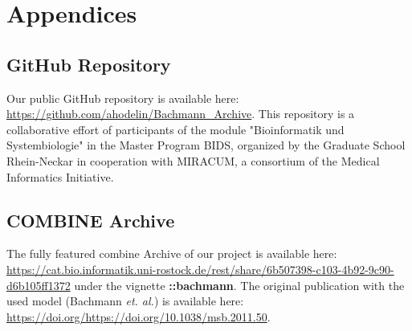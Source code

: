 \section*{Appendices}

\subsection*{GitHub Repository}

Our public GitHub repository is available here: \url{https://github.com/ahodelin/Bachmann_Archive}.
This repository is a collaborative effort of participants of the module "Bioinformatik und Systembiologie" in the Master Program BIDS, organized by the Graduate School Rhein-Neckar in cooperation with MIRACUM, a consortium of the Medical Informatics Initiative.

\subsection*{COMBINE Archive}

The fully featured \ac{combine} Archive of our project is available here: \url{https://cat.bio.informatik.uni-rostock.de/rest/share/6b507398-c103-4b92-9c90-d6b105ff1372} under the vignette  \textbf{::bachmann}. The original publication with the used model (Bachmann \textit{et. al.}) is available here: \url{https://doi.org/https://doi.org/10.1038/msb.2011.50}.